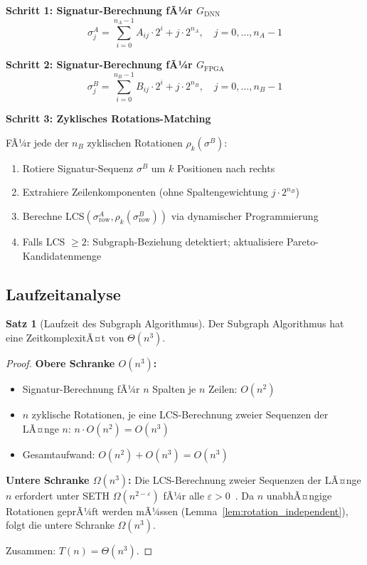 ﻿\documentclass[a4paper,12pt]{article}
\theoremstyle{definition}
\newtheorem{satz}{Satz}
\begin{document}
\medskip
\textbf{Schritt 1: Signatur-Berechnung fÃ¼r $G_{\text{DNN}}$}
\[
    \sigma_j^A = \sum_{i=0}^{n_A-1} A_{ij} \cdot 2^i + j \cdot 2^{n_A}, \quad j = 0, \ldots, n_A - 1
\]

\textbf{Schritt 2: Signatur-Berechnung fÃ¼r $G_{\text{FPGA}}$}
\[
    \sigma_j^B = \sum_{i=0}^{n_B-1} B_{ij} \cdot 2^i + j \cdot 2^{n_B}, \quad j = 0, \ldots, n_B - 1
\]

\textbf{Schritt 3: Zyklisches Rotations-Matching}

FÃ¼r jede der $n_B$ zyklischen Rotationen $\rho_k(\sigma^B)$:
\begin{enumerate}
    \item Rotiere Signatur-Sequenz $\sigma^B$ um $k$ Positionen nach rechts
    \item Extrahiere Zeilenkomponenten (ohne Spaltengewichtung $j \cdot 2^{n_B}$)
    \item Berechne LCS$(\sigma^A_{\text{row}}, \rho_k(\sigma^B_{\text{row}}))$ via dynamischer Programmierung
    \item Falls LCS $\geq 2$: Subgraph-Beziehung detektiert; aktualisiere Pareto-Kandidatenmenge
\end{enumerate}

\subsection{Laufzeitanalyse}

\begin{satz}[Laufzeit des Subgraph Algorithmus]
\label{satz:laufzeit}
    Der Subgraph Algorithmus hat eine ZeitkomplexitÃ¤t von $\Theta(n^3)$.
\end{satz}

\begin{proof}
    \textbf{Obere Schranke $O(n^3)$:}
    \begin{itemize}
        \item Signatur-Berechnung fÃ¼r $n$ Spalten je $n$ Zeilen: $O(n^2)$
        \item $n$ zyklische Rotationen, je eine LCS-Berechnung zweier Sequenzen der LÃ¤nge $n$: $n \cdot O(n^2) = O(n^3)$
        \item Gesamtaufwand: $O(n^2) + O(n^3) = O(n^3)$
    \end{itemize}
    
    \textbf{Untere Schranke $\Omega(n^3)$:}
    Die LCS-Berechnung zweier Sequenzen der LÃ¤nge $n$ erfordert unter SETH
    $\Omega(n^{2-\varepsilon})$ fÃ¼r alle $\varepsilon > 0$~\cite{abboud2015}.
    Da $n$ unabhÃ¤ngige Rotationen geprÃ¼ft werden mÃ¼ssen (Lemma~\ref{lem:rotation_independent}),
    folgt die untere Schranke $\Omega(n^3)$.
    
    Zusammen: $T(n) = \Theta(n^3)$.
\end{proof}
\end{document}
